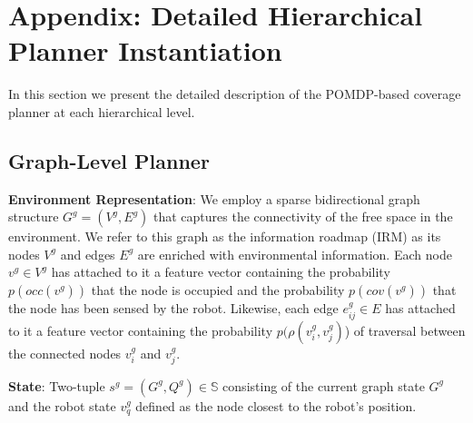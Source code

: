 \documentclass[letterpaper]{article} %
\newcommand{\ph}[1]{{\textbf{#1}:}} %
\begin{document}
\appendix
\section{Appendix: Detailed Hierarchical Planner Instantiation}\label{sec:appendix}

In this section we present the detailed description of the POMDP-based coverage planner at each hierarchical level.









\subsection{Graph-Level Planner} 


\ph{Environment Representation} We employ a sparse bidirectional graph structure $G^g = (V^g, E^g)$ that captures the connectivity of the free space in the environment. We refer to this graph as the information roadmap (IRM) as its nodes $V^g$ and edges $E^g$ are enriched with environmental information. Each node $v^g \in V^g$ has attached to it a feature vector containing the probability $p(occ(v^g))$ that the node is occupied and the probability $p(cov(v^g))$ that the node has been sensed by the robot. Likewise, each edge $e_{ij}^g \in E$ has attached to it a feature vector containing the probability $p(\rho(v_i^g, v_j^g)$) of traversal between the connected nodes $v_i^g$ and $v_j^g$.

\ph{State} Two-tuple $s^g=(G^g, Q^g) \in \mathbb{S}$ consisting of the current graph state $G^g$ and the robot state $v_q^g$ defined as the node closest to the robot's position. 
\end{document}
